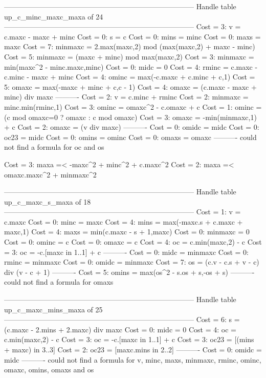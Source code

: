 --------------------------------------------------------------------------------
Handle table up_c_minc_maxc_maxa of 24
--------------------------------------------------------------------------------
Cost =  3:  v       = c.maxc - maxc + minc
Cost =  0:  s       = c
Cost =  0:  mins    = minc
Cost =  0:  maxs    = maxc
Cost =  7:  minmaxc = 2.max(maxc,2) mod (max(maxc,2) + maxc - minc)
Cost =  5:  minmaxc = (maxc + minc) mod max(maxc,2)
Cost =  3:  minmaxc = min(maxc^2 - minc.maxc,minc)
Cost =  0:  midc    = 0
Cost =  4:  rminc   = c.maxc - c.minc - maxc + minc
Cost =  4:  ominc   = max(-c.maxc + c.minc + c,1)
Cost =  5:  omaxc   = max(-maxc + minc + c,c - 1)
Cost =  4:  omaxc   = (c.maxc - maxc + minc) div maxc
----------
Cost =  2:  v       = c.minc + rminc
Cost =  2:  minmaxc = minc.min(rminc,1)
Cost =  3:  ominc   = omaxc^2 - c.omaxc + c
Cost =  1:  ominc   = (c mod omaxc=0 ? omaxc : c mod omaxc)
Cost =  3:  omaxc   = -min(minmaxc,1) + c
Cost =  2:  omaxc   = (v div maxc)
----------
Cost =  0:  omidc   = midc
Cost =  0:  oc23    = midc
Cost =  0:  omins   = ominc
Cost =  0:  omaxs   = omaxc
----------
could not find a formula for oc and os

Cost =  3:  maxa =< -maxc^2 + minc^2 + c.maxc^2
Cost =  2:  maxa =< omaxc.maxc^2 + minmaxc^2

--------------------------------------------------------------------------------
Handle table up_c_maxc_s_maxa of 18
--------------------------------------------------------------------------------
Cost =  1:  v       = c.maxc
Cost =  0:  minc    = maxc
Cost =  4:  mins    = max(-maxc.s + c.maxc + maxc,1)
Cost =  4:  maxs    = min(c.maxc - s + 1,maxc)
Cost =  0:  minmaxc = 0
Cost =  0:  ominc   = c
Cost =  0:  omaxc   = c
Cost =  4:  oc      = c.min(maxc,2) - c
Cost =  3:  oc      = -c.[maxc in 1..1] + c
----------
Cost =  0:  midc    = minmaxc
Cost =  0:  rminc   = minmaxc
Cost =  0:  omidc   = minmaxc
Cost =  7:  os      = (c.v - c.s + v - c) div (v - c + 1)
----------
Cost =  5:  omins   = max(os^2 - s.os + s,-os + s)
----------
could not find a formula for omaxs


--------------------------------------------------------------------------------
Handle table up_c_maxc_mins_maxa of 25
--------------------------------------------------------------------------------
Cost =  6:  s       = (c.maxc - 2.mins + 2.maxc) div maxc
Cost =  0:  midc    = 0
Cost =  4:  oc      = c.min(maxc,2) - c
Cost =  3:  oc      = -c.[maxc in 1..1] + c
Cost =  3:  oc23    = [(mins + maxc) in 3..3]
Cost =  2:  oc23    = [maxc.mins in 2..2]
----------
Cost =  0:  omidc   = midc
----------
could not find a formula for v, minc, maxs, minmaxc, rminc, ominc, omaxc, omins, omaxs and os

